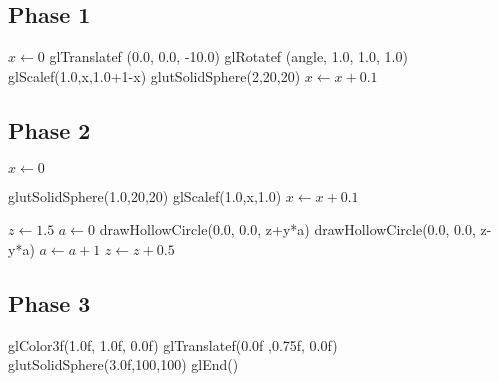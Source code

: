 \documentclass[letterpaper, 10 pt, conference]{ieeeconf}  %
\begin{document}
\subsection{Phase 1}
     \begin{algorithmic}
     \State $ x \leftarrow 0 $\;
  \Do
    \State glTranslatef (0.0, 0.0, -10.0)\;
  	\State	glRotatef (angle, 1.0, 1.0, 1.0)\;
     \State 		glScalef(1.0,x,1.0+1-x)\;
     \State 	glutSolidSphere(2,20,20)\;
	\State $ x \leftarrow x+0.1 $\;
\end{algorithmic}

\subsection{Phase 2}
\begin{algorithmic}\State $ x \leftarrow 0 $\;

\Do 
       \State  glutSolidSphere(1.0,20,20)\;
      	\State	glScalef(1.0,x,1.0)\;
      	\State $ x \leftarrow x+0.1 $\;
 \\

\end{algorithmic}
    
 \begin{algorithmic}
 \State $ z \leftarrow 1.5 $\;
\Do 
    \State $ a \leftarrow 0 $\;
    \Do 		
			\State drawHollowCircle(0.0, 0.0, z+y*a)\;
 			\State drawHollowCircle(0.0, 0.0, z-y*a)\;
 			\State $ a \leftarrow a+1 $\;
        \State $ z \leftarrow z+0.5 $\;
 \\
\end{algorithmic}
\subsection{Phase 3}

\begin{algorithmic}
\State		glColor3f(1.0f, 1.0f, 0.0f)\;
\State		glTranslatef(0.0f ,0.75f, 0.0f) \;
  \State  glutSolidSphere(3.0f,100,100) \;
  \State glEnd() \;
\EndFunction
\end{algorithmic}


\end{document}
